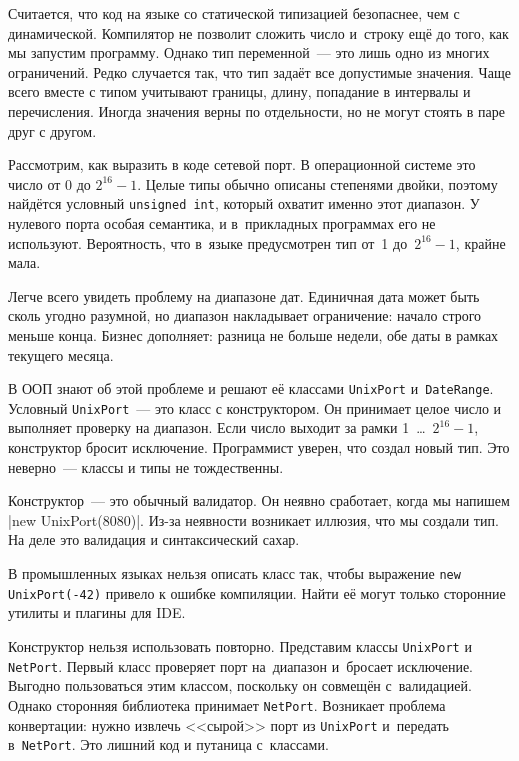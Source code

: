 
Считается, что код на языке со статической типизацией безопаснее, чем с
динамической. Компилятор не позволит сложить число и~строку ещё до того, как
мы запустим программу. Однако тип переменной~--- это лишь одно из многих
ограничений. Редко случается так, что тип задаёт все допустимые
значения. Чаще всего вместе с типом учитывают границы, длину, попадание в
интервалы и перечисления. Иногда значения верны по отдельности, но не могут
стоять в паре друг с другом.


Рассмотрим, как выразить в коде сетевой порт. В операционной системе это число
от 0 до $2^{16}-1$. Целые типы обычно описаны степенями двойки, поэтому найдётся
условный \verb|unsigned int|, который охватит именно этот диапазон. У нулевого
порта особая семантика, и в~прикладных программах его не используют.
Вероятность, что в~языке предусмотрен тип от~1 до~$2^{16}-1$, крайне мала.

Легче всего увидеть проблему на диапазоне дат. Единичная дата может быть сколь
угодно разумной, но диапазон накладывает ограничение: начало строго меньше
конца. Бизнес дополняет: разница не больше недели, обе даты в рамках текущего
месяца.


В ООП знают об этой проблеме и решают её классами \verb|UnixPort|
и~\verb|DateRange|. Условный \verb|UnixPort|~--- это класс с конструктором. Он
принимает целое число и выполняет проверку на диапазон. Если число выходит за
рамки 1~\dots~$2^{16}-1$, конструктор бросит исключение. Программист уверен, что
создал новый тип. Это неверно~--- классы и типы не тождественны.

Конструктор~--- это обычный валидатор. Он неявно сработает, когда мы напишем
\spverb|new UnixPort(8080)|. Из-за неявности возникает иллюзия, что мы создали
тип. На деле это валидация и синтаксический сахар.


В промышленных языках нельзя описать класс так, чтобы выражение
\verb|new UnixPort(-42)| привело к ошибке компиляции. Найти её могут
только сторонние утилиты и плагины для IDE.

Конструктор нельзя использовать повторно. Представим классы \verb|UnixPort| и
\verb|NetPort|. Первый класс проверяет порт на~диапазон и~бросает
исключение. Выгодно пользоваться этим классом, поскольку он совмещён
с~валидацией. Однако сторонняя библиотека принимает \verb|NetPort|. Возникает
проблема конвертации: нужно извлечь <<сырой>> порт из \verb|UnixPort|
и~передать в~\verb|NetPort|. Это лишний код и путаница с~классами.

